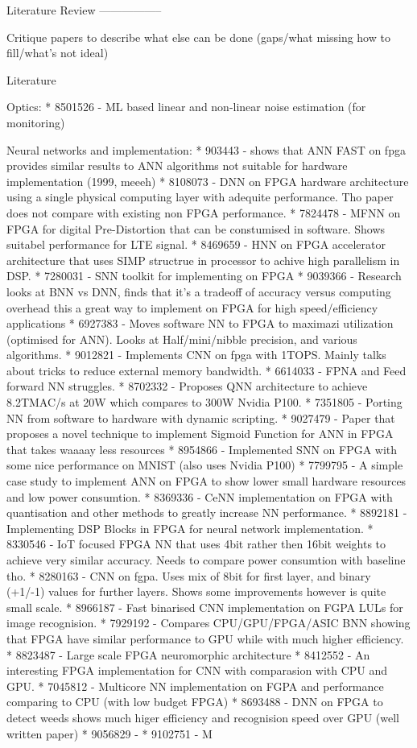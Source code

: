 
\iffalse
Literature Review
-----------------

Critique papers to describe what else can be done (gaps/what missing how to fill/what's not ideal)

Literature

Optics:
* 8501526 - ML based linear and non-linear noise estimation (for monitoring)

Neural networks and implementation:
* 903443 - shows that ANN FAST on fpga provides similar results to ANN algorithms not suitable for hardware implementation (1999, meeeh)
* 8108073 - DNN on FPGA hardware architecture using a single physical computing layer with adequite performance. Tho paper does not compare with existing non FPGA performance.
* 7824478 - MFNN on FPGA for digital Pre-Distortion that can be constumised in software. Shows suitabel performance for LTE signal.
* 8469659 - HNN on FPGA accelerator architecture that uses SIMP structrue in processor to achive high parallelism in DSP.
* 7280031 - SNN toolkit for implementing on FPGA
* 9039366 - Research looks at BNN vs DNN, finds that it's a tradeoff of accuracy versus computing overhead this a great way to implement on FPGA for high speed/efficiency applications
* 6927383 - Moves software NN to FPGA to maximazi utilization (optimised for ANN). Looks at Half/mini/nibble precision, and various algorithms.
* 9012821 - Implements CNN on fpga with 1TOPS. Mainly talks about tricks to reduce external memory bandwidth.
* 6614033 - FPNA and Feed forward NN struggles.
* 8702332 - Proposes QNN architecture to achieve 8.2TMAC/s at 20W which compares to 300W Nvidia P100.
* 7351805 - Porting NN from software to hardware with dynamic scripting.
* 9027479 - Paper that proposes a novel technique to implement Sigmoid Function for ANN in FPGA that takes waaaay less resources
* 8954866 - Implemented SNN on FPGA with some nice performance on MNIST (also uses Nvidia P100)
* 7799795 - A simple case study to implement ANN on FPGA to show lower small hardware resources and low power consumtion.
* 8369336 - CeNN implementation on FPGA with quantisation and other methods to greatly increase NN performance.
* 8892181 - Implementing DSP Blocks in FPGA for neural network implementation.
* 8330546 - IoT focused FPGA NN that uses 4bit rather then 16bit weights to achieve very similar accuracy. Needs to compare power consumtion with baseline tho.
* 8280163 - CNN on fgpa. Uses mix of 8bit for first layer, and binary (+1/-1) values for further layers. Shows some improvements however is quite small scale.
* 8966187 - Fast binarised CNN implementation on FGPA LULs for image recognision.
* 7929192 - Compares CPU/GPU/FPGA/ASIC BNN showing that FPGA have similar performance to GPU while with much higher efficiency.
* 8823487 - Large scale FPGA neuromorphic architecture
* 8412552 - An interesting FPGA implementation for CNN with comparasion with CPU and GPU.
* 7045812 - Multicore NN implementation on FGPA and performance comparing to CPU (with low budget FPGA)
* 8693488 - DNN on FPGA to detect weeds shows much higer efficiency and recognision speed over GPU (well written paper)
* 9056829 - 
* 9102751 - M

